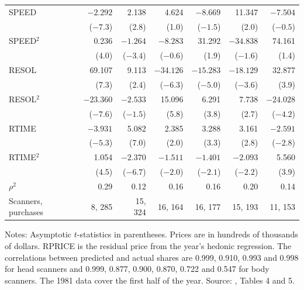 \begin{table}[htbp]
\begin{tabular}{@{}lrrrrrr@{}}
SPEED & $-2.292$ & 2.138 & 4.624 & $-8.669$ & 11.347 & $-7.504$ \\
      & ($-7.3$) & (2.8) & (1.0) & ($-1.5$) & (2.0) & ($-0.5$) \\
SPEED$^2$ & 0.236 & $-1.264$ & $-8.283$ & 31.292 & $-34.838$ & 74.161 \\
      & (4.0) & ($-3.4$) & ($-0.6$) & (1.9) & ($-1.6$) & (1.4) \\
RESOL & 69.107 & 9.113 & $-34.126$ & $-15.283$ & $-18.129$ & 32.877 \\
      & (7.3) & (2.4) & ($-6.3$) & ($-5.0$) & ($-3.6$) & (3.9) \\
RESOL$^2$ & $-23.360$ & $-2.533$ & 15.096 & 6.291 & 7.738 & $-24.028$ \\
      & ($-7.6$) & ($-1.5$) & (5.8) & (3.8) & (2.7) & ($-4.2$) \\
RTIME & $-3.931$ & 5.082 & 2.385 & 3.288 & 3.161 & $-2.591$ \\
      & ($-5.3$) & (7.0) & (2.0) & (3.3) & (2.8) & ($-2.8$) \\
RTIME$^2$ & 1.054 & $-2.370$ & $-1.511$ & $-1.401$ & $-2.093$ & 5.560 \\
      & (4.5) & ($-6.7$) & ($-2.0$) & ($-2.1$) & ($-2.2$) & (3.9) \\
$\rho^2$ & 0.29 & 0.12 & 0.16 & 0.16 & 0.20 & 0.14 \\
Scanners, purchases & 8, 285 & 15, 324 & 16, 164 & 16, 177 & 15, 193 & 11, 153 \\
\bottomrule
\end{tabular}

\smallskip
\begin{minipage}{0.94\linewidth}
\footnotesize Notes: Asymptotic $t$-statistics in parentheses. Prices are in hundreds of thousands of dollars.
RPRICE is the residual price from the year's hedonic regression. The correlations between predicted and actual
shares are 0.999, 0.910, 0.993 and 0.998 for head scanners and 0.999, 0.877, 0.900, 0.870, 0.722 and 0.547 for body
scanners. The 1981 data cover the first half of the year. Source: \citet{Trajtenberg1985}, Tables 4 and 5.
\end{minipage}
\end{table}

